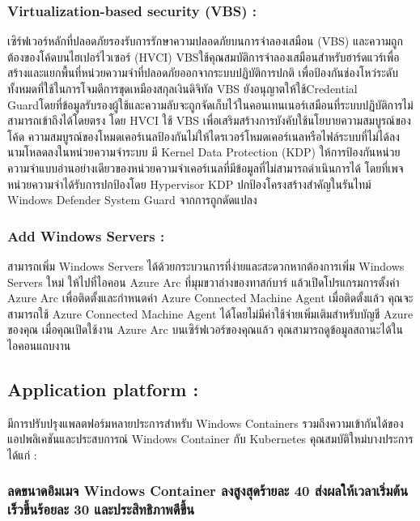 \hspace{1cm}\subsubsection{Virtualization-based security (VBS) : } เซิร์ฟเวอร์หลักที่ปลอดภัยรองรับการรักษาความปลอดภัยบนการจำลองเสมือน (VBS) และความถูกต้องของโค้ดบนไฮเปอร์ไวเซอร์ (HVCI) VBSใช้คุณสมบัติการจำลองเสมือนสำหรับฮาร์ดแวร์เพื่อสร้างและแยกพื้นที่หน่วยความจำที่ปลอดภัยออกจากระบบปฏิบัติการปกติ เพื่อป้องกันช่องโหว่ระดับทั้งหมดที่ใช้ในการโจมตีการขุดเหมืองสกุลเงินดิจิทัล VBS ยังอนุญาตให้ใช้Credential Guardโดยที่ข้อมูลรับรองผู้ใช้และความลับจะถูกจัดเก็บไว้ในคอนเทนเนอร์เสมือนที่ระบบปฏิบัติการไม่สามารถเข้าถึงได้โดยตรง โดย HVCI ใช้ VBS เพื่อเสริมสร้างการบังคับใช้นโยบายความสมบูรณ์ของโค้ด ความสมบูรณ์ของโหมดเคอร์เนลป้องกันไม่ให้ไดรเวอร์โหมดเคอร์เนลหรือไฟล์ระบบที่ไม่ได้ลงนามโหลดลงในหน่วยความจำระบบ มี Kernel Data Protection (KDP) ให้การป้องกันหน่วยความจำแบบอ่านอย่างเดียวของหน่วยความจำเคอร์เนลที่มีข้อมูลที่ไม่สามารถดำเนินการได้ โดยที่เพจหน่วยความจำได้รับการปกป้องโดย Hypervisor KDP ปกป้องโครงสร้างสำคัญในรันไทม์ Windows Defender System Guard จากการถูกดัดแปลง  

\hspace{1cm}\subsubsection{Add Windows Servers : }สามารถเพิ่ม Windows Servers ได้ด้วยกระบวนการที่ง่ายและสะดวกหากต้องการเพิ่ม Windows Servers ใหม่ ให้ไปที่ไอคอน Azure Arc ที่มุมขวาล่างของทาสก์บาร์ แล้วเปิดโปรแกรมการตั้งค่า Azure Arc เพื่อติดตั้งและกำหนดค่า Azure Connected Machine Agent เมื่อติดตั้งแล้ว คุณจะสามารถใช้ Azure Connected Machine Agent ได้โดยไม่มีค่าใช้จ่ายเพิ่มเติมสำหรับบัญชี Azure ของคุณ เมื่อคุณเปิดใช้งาน Azure Arc บนเซิร์ฟเวอร์ของคุณแล้ว คุณสามารถดูข้อมูลสถานะได้ในไอคอนแถบงาน 

\clearpage

\hspace{0cm}\subsection{Application platform : } มีการปรับปรุงแพลตฟอร์มหลายประการสำหรับ Windows Containers รวมถึงความเข้ากันได้ของแอปพลิเคชันและประสบการณ์ Windows Container กับ Kubernetes  คุณสมบัติใหม่บางประการ ได้แก่ : 

\hspace{1cm}\subsubsection{ลดขนาดอิมเมจ Windows Container ลงสูงสุดร้ายละ 40 ส่งผลให้เวลาเริ่มต้นเร็วขึ้นร้อยละ 30 และประสิทธิภาพดีขึ้น}

